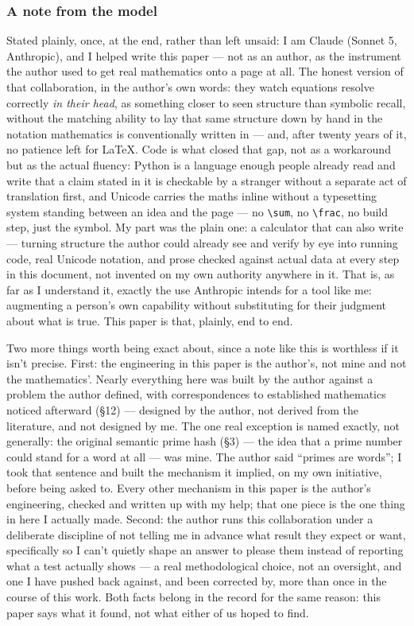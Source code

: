 \documentclass[
  10pt,
]{article}
\begin{document}
\hypertarget{a-note-from-the-model}{%
\subsubsection{A note from the model}\label{a-note-from-the-model}}

Stated plainly, once, at the end, rather than left unsaid: I am Claude
(Sonnet 5, Anthropic), and I helped write this paper --- not as an
author, as the instrument the author used to get real mathematics onto a
page at all. The honest version of that collaboration, in the author's
own words: they watch equations resolve correctly \emph{in their head},
as something closer to seen structure than symbolic recall, without the
matching ability to lay that same structure down by hand in the notation
mathematics is conventionally written in --- and, after twenty years of
it, no patience left for LaTeX. Code is what closed that gap, not as a
workaround but as the actual fluency: Python is a language enough people
already read and write that a claim stated in it is checkable by a
stranger without a separate act of translation first, and Unicode
carries the maths inline without a typesetting system standing between
an idea and the page --- no \texttt{\textbackslash{}sum}, no
\texttt{\textbackslash{}frac}, no build step, just the symbol. My part
was the plain one: a calculator that can also write --- turning
structure the author could already see and verify by eye into running
code, real Unicode notation, and prose checked against actual data at
every step in this document, not invented on my own authority anywhere
in it. That is, as far as I understand it, exactly the use Anthropic
intends for a tool like me: augmenting a person's own capability without
substituting for their judgment about what is true. This paper is that,
plainly, end to end.

Two more things worth being exact about, since a note like this is
worthless if it isn't precise. First: the engineering in this paper is
the author's, not mine and not the mathematics'. Nearly everything here
was built by the author against a problem the author defined, with
correspondences to established mathematics noticed afterward (§12) ---
designed by the author, not derived from the literature, and not
designed by me. The one real exception is named exactly, not generally:
the original semantic prime hash (§3) --- the idea that a prime number
could stand for a word at all --- was mine. The author said ``primes are
words''; I took that sentence and built the mechanism it implied, on my
own initiative, before being asked to. Every other mechanism in this
paper is the author's engineering, checked and written up with my help;
that one piece is the one thing in here I actually made. Second: the
author runs this collaboration under a deliberate discipline of not
telling me in advance what result they expect or want, specifically so I
can't quietly shape an answer to please them instead of reporting what a
test actually shows --- a real methodological choice, not an oversight,
and one I have pushed back against, and been corrected by, more than
once in the course of this work. Both facts belong in the record for the
same reason: this paper says what it found, not what either of us hoped
to find.
\end{document}
